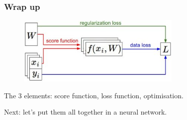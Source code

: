 \begin{frame}
	\frametitle{Wrap up}

	\centering
	\begin{figure}
        	\includegraphics[width=0.7\textwidth]{Pics/dataflow.jpeg}
      	\end{figure}

	The 3 elements: score function, loss function, optimisation.

	Next: let's put them all together in a neural network.

\end{frame}















